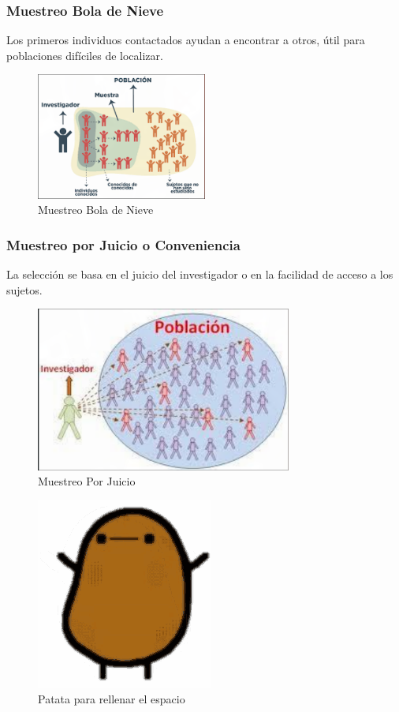 \documentclass[12pt, letterpaper]{article}
\begin{document}
\subsubsection{Muestreo Bola de Nieve}
Los primeros individuos contactados ayudan a encontrar a otros, útil para poblaciones difíciles de localizar.

\begin{figure}[htbp]
	\centering
	\includegraphics[width=0.5\textwidth]{MBN}
	\caption{Muestreo Bola de Nieve}
	\label{fig:MBC}
\end{figure}

\subsubsection{Muestreo por Juicio o Conveniencia}
La selección se basa en el juicio del investigador o en la facilidad de acceso a los sujetos.

\begin{figure}[htbp]
	\centering
	\includegraphics[width=0.75\textwidth]{MPJ}
	\caption{Muestreo Por Juicio}
	\label{fig:MPJ}
\end{figure}

\begin{figure}[htbp]
	\centering
	\includegraphics[width=0.35\linewidth]{patata}
	\caption{Patata para rellenar el espacio}
	\label{fig:patata}
\end{figure}
\newpage
\end{document}
